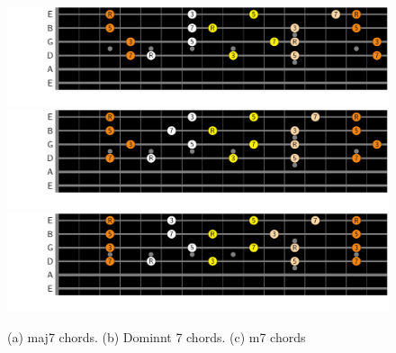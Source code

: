 \documentclass{article}
\begin{document}
\begin{figure}[h!]
	\centering
	\hspace*{-2.2cm}
	\includegraphics[scale=0.7, trim= {0cm 0cm 0cm 0cm}, clip]{figures/chord-inversions/maj7.pdf}
	\hspace*{-2.2cm}
	\includegraphics[scale=0.7, trim= {0cm 0cm 0cm 0cm}, clip]{figures/chord-inversions/Dominant7.pdf}
	\hspace*{-2.2cm}
	\includegraphics[scale=0.7, trim= {0cm 0cm 0cm 0cm}, clip]{figures/chord-inversions/m7.pdf}
	\caption{(a) maj7 chords. (b) Dominnt 7 chords. (c) m7 chords  }
	\label{fig}
\end{figure}

\end{document}
